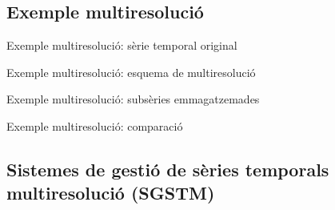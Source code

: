 \subsection*{Exemple multiresolució}


\begin{frame}{Exemple multiresolució: sèrie temporal original}

\begin{center}
\scriptsize

\end{center}

\end{frame}

\begin{frame}{Exemple multiresolució: esquema de multiresolució}


\begin{center}

\end{center}

\end{frame}

\begin{frame}{Exemple multiresolució: subsèries emmagatzemades}


\begin{center}
\scriptsize

\end{center}

\end{frame}

\begin{frame}{Exemple multiresolució: comparació}

\begin{center}
\scriptsize

\end{center}

\end{frame}


\subsection[SGSTM]{Sistemes de gestió de sèries temporals multiresolució (SGSTM)}

